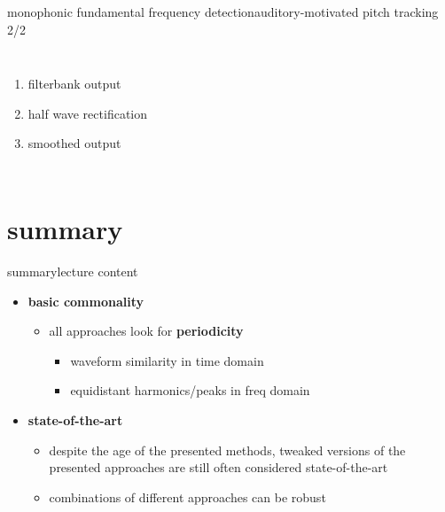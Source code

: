 	\begin{frame}{monophonic fundamental frequency detection}{auditory-motivated pitch tracking 2/2}
        \begin{columns}
            \begin{enumerate}
                \item   filterbank output
                \bigskip
                \bigskip
                \bigskip
                \item   half wave rectification
                \bigskip
                \bigskip
                \bigskip
                \item   smoothed output
            \end{enumerate}
            \vspace{-3mm}
        \end{columns}
	\end{frame}
        
    \section{summary}
        \begin{frame}{summary}{lecture content}
            \begin{itemize}
                \item   \textbf{basic commonality}
                    \begin{itemize}
                        \item   all approaches look for \textbf{periodicity}
                            \begin{itemize}
                                \item   waveform similarity in time domain
                                \item   equidistant harmonics/peaks in freq domain
                            \end{itemize}
                    \end{itemize}
                \bigskip
                \item   \textbf{state-of-the-art}
                    \begin{itemize}
                        \item   despite the age of the presented methods, tweaked versions of the presented approaches are still often considered state-of-the-art
                        \item   combinations of different approaches can be robust
                    \end{itemize}
            \end{itemize}
        \end{frame}

